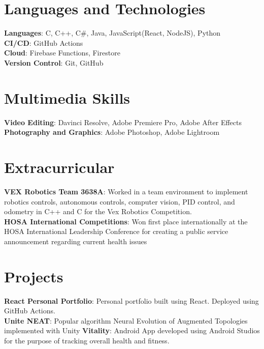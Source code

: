 \documentclass[letterpaper,10pt]{article}
\begin{document}
\section{Languages and Technologies} 
 \begin{itemize}[leftmargin=0.15in, label={}]
    \small{\item{
    \textbf{Languages}{: C, C++, C\#, Java, JavaScript(React, NodeJS), Python} \\
     \textbf{CI/CD}{: GitHub Actions} \\
     \textbf{Cloud}{: Firebase Functions, Firestore}\\
     \textbf{Version Control}{: Git, GitHub}
    }}
 \end{itemize}
 \vspace{-20pt}
\section{Multimedia Skills} 
 \begin{itemize}[leftmargin=0.15in, label={}]
    \small{\item{
    \textbf{Video Editing}{: Davinci Resolve, Adobe Premiere Pro, Adobe After Effects} \\
     \textbf{Photography and Graphics}{: Adobe Photoshop, Adobe Lightroom} \\
    }}
 \end{itemize}

\section{Extracurricular}
 \begin{itemize}[leftmargin=0.15in, label={}]
    \small{\item{
     \textbf{VEX Robotics Team 3638A}{: Worked in a team environment to implement robotics controls,
autonomous controls, computer vision, PID control, and odometry
in C++ and C for the Vex Robotics Competition.} \\
     \textbf{HOSA International Competitions}{: Won first place internationally at the HOSA International Leadership Conference for creating a public service announcement regarding current health issues} 

    }}

 \end{itemize}
\section{Projects}
 \begin{itemize}[leftmargin=0.15in, label={}]
    \small{\item{
     \textbf{React Personal Portfolio}{: Personal portfolio built using React. Deployed using GitHub Actions.} \\
     \textbf{Unite NEAT}{: Popular algorithm Neural Evolution of Augmented Topologies implemented with Unity} 
     \textbf{Vitality}{: Android App developed using Android Studios for the purpose of tracking overall health and fitness.} 

    }}

 \end{itemize}
\end{document}
